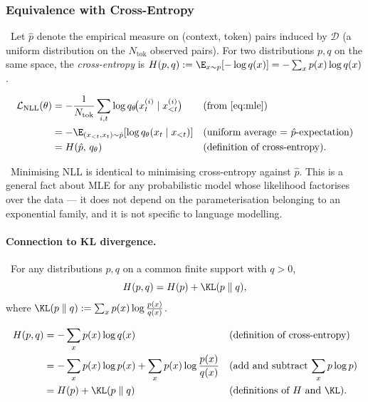 \subsubsection{Equivalence with Cross-Entropy}

\Def\ Let $\hat p$ denote the empirical measure on (context, token)
pairs induced by $\mathcal{D}$ (a uniform distribution on the
$N_{\mathrm{tok}}$ observed pairs). For two distributions $p, q$ on the
same space, the \emph{cross-entropy} is
$H(p, q) := \E_{x \sim p}[-\log q(x)] = -\sum_x p(x) \log q(x)$.

\begin{derivation}
\begin{align}
\mathcal{L}_{\mathrm{NLL}}(\theta)
  &= -\frac{1}{N_{\mathrm{tok}}} \sum_{i,t}
       \log q_\theta\!\big(x^{(i)}_t \mid x^{(i)}_{<t}\big)
  && \text{(from \ref{eq:mle})} \\
  &= -\E_{(x_{<t}, x_t) \sim \hat p}\!\left[
       \log q_\theta(x_t \mid x_{<t}) \right]
  && \text{(uniform average $=$ $\hat p$-expectation)} \\
  &= H(\hat p,\, q_\theta)
  && \text{(definition of cross-entropy)}.
\label{eq:nll-ce}
\end{align}
\end{derivation}

\Ident\ Minimising NLL is identical to minimising cross-entropy against
$\hat p$. This is a general fact about MLE for any probabilistic
model whose likelihood factorises over the data --- it does not
depend on the parameterisation belonging to an exponential family,
and it is not specific to language modelling.

\paragraph{Connection to KL divergence.}
\Ident\ For any distributions $p, q$ on a common finite support with
$q > 0$,
\begin{equation}
H(p, q) = H(p) + \KL(p \parallel q),
\label{eq:ce-kl}
\end{equation}
where $\KL(p \parallel q) := \sum_x p(x) \log \frac{p(x)}{q(x)}$.

\begin{derivation}[: $H(p,q) = H(p) + \KL(p \parallel q)$]
\begin{align}
H(p, q)
  &= -\sum_x p(x) \log q(x)
  && \text{(definition of cross-entropy)} \\
  &= -\sum_x p(x) \log p(x)
       + \sum_x p(x) \log \frac{p(x)}{q(x)}
  && \text{(add and subtract $\sum_x p \log p$)} \\
  &= H(p) + \KL(p \parallel q)
  && \text{(definitions of $H$ and $\KL$)}.
\end{align}
\end{derivation}

